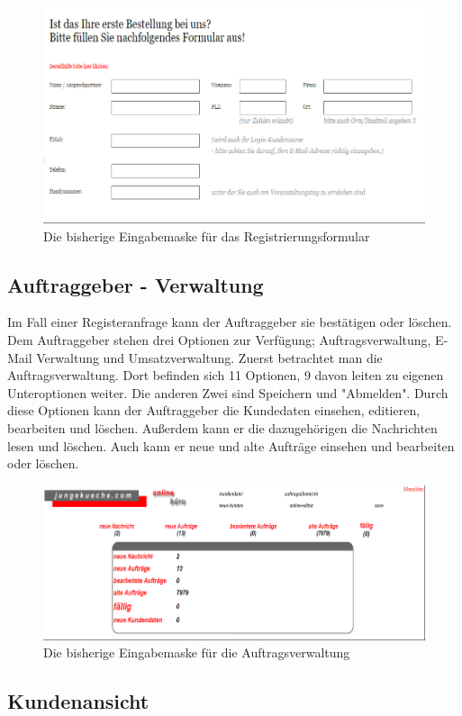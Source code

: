 \begin{figure}
	\centering
	\includegraphics[width=0.7\linewidth]{Graphics/registerForm.png}
	\caption[Registerformular]{Die bisherige Eingabemaske für das Registrierungsformular}
	\label{fig:registerForm}
\end{figure}

\subsection{Auftraggeber - Verwaltung}

Im Fall einer Registeranfrage kann der Auftraggeber sie bestätigen oder löschen. Dem Auftraggeber stehen drei Optionen zur Verfügung; Auftragsverwaltung, E-Mail Verwaltung und Umsatzverwaltung. Zuerst betrachtet man die Auftragsverwaltung. Dort befinden sich 11 Optionen, 9 davon leiten zu eigenen Unteroptionen weiter. Die anderen Zwei sind Speichern und "Abmelden". Durch diese Optionen kann der Auftraggeber die Kundedaten einsehen, editieren, bearbeiten und löschen. Außerdem kann er die dazugehörigen die Nachrichten lesen und löschen. Auch kann er neue und alte Aufträge einsehen und bearbeiten oder löschen.

\begin{figure}[h]
	\centering
	\includegraphics[width=0.7\linewidth]{Graphics/Auftragverwaltung.png}
	\caption[Auftragsverwaltung]{Die bisherige Eingabemaske für die Auftragsverwaltung}
	\label{fig:Auftragverwaltung}
\end{figure}

\subsection{Kundenansicht}

